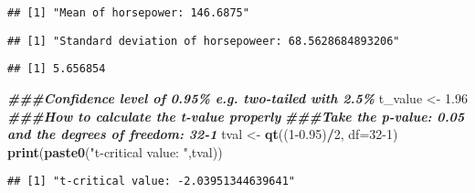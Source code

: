 \documentclass[
]{book}
\newenvironment{Shaded}{\begin{snugshade}}{\end{snugshade}}
\newcommand{\AttributeTok}[1]{\textcolor[rgb]{0.13,0.29,0.53}{#1}}
\newcommand{\DecValTok}[1]{\textcolor[rgb]{0.00,0.00,0.81}{#1}}
\newcommand{\DocumentationTok}[1]{\textcolor[rgb]{0.56,0.35,0.01}{\textbf{\textit{#1}}}}
\newcommand{\FloatTok}[1]{\textcolor[rgb]{0.00,0.00,0.81}{#1}}
\newcommand{\FunctionTok}[1]{\textcolor[rgb]{0.13,0.29,0.53}{\textbf{#1}}}
\newcommand{\NormalTok}[1]{#1}
\newcommand{\OtherTok}[1]{\textcolor[rgb]{0.56,0.35,0.01}{#1}}
\newcommand{\SpecialCharTok}[1]{\textcolor[rgb]{0.81,0.36,0.00}{\textbf{#1}}}
\newcommand{\StringTok}[1]{\textcolor[rgb]{0.31,0.60,0.02}{#1}}
\theoremstyle{definition}
\theoremstyle{definition}
\theoremstyle{definition}
\theoremstyle{definition}
\theoremstyle{remark}
\begin{document}
\begin{verbatim}
## [1] "Mean of horsepower: 146.6875"
\end{verbatim}

\begin{Shaded}
\end{Shaded}

\begin{verbatim}
## [1] "Standard deviation of horsepoweer: 68.5628684893206"
\end{verbatim}

\begin{Shaded}
\end{Shaded}

\begin{verbatim}
## [1] 5.656854
\end{verbatim}

\begin{Shaded}
\begin{Highlighting}[]
\DocumentationTok{\#\#\#Confidence level of 0.95\% e.g. two{-}tailed with 2.5\%}
\NormalTok{t\_value }\OtherTok{\textless{}{-}} \FloatTok{1.96}
\DocumentationTok{\#\#\#How to calculate the t{-}value properly}
\DocumentationTok{\#\#\#Take the p{-}value: 0.05 and the degrees of freedom: 32{-}1}
\NormalTok{tval }\OtherTok{\textless{}{-}} \FunctionTok{qt}\NormalTok{((}\DecValTok{1}\FloatTok{{-}0.95}\NormalTok{)}\SpecialCharTok{/}\DecValTok{2}\NormalTok{, }\AttributeTok{df=}\DecValTok{32{-}1}\NormalTok{)}
\FunctionTok{print}\NormalTok{(}\FunctionTok{paste0}\NormalTok{(}\StringTok{"t{-}critical value: "}\NormalTok{,tval))}
\end{Highlighting}
\end{Shaded}

\begin{verbatim}
## [1] "t-critical value: -2.03951344639641"
\end{verbatim}
\end{document}
